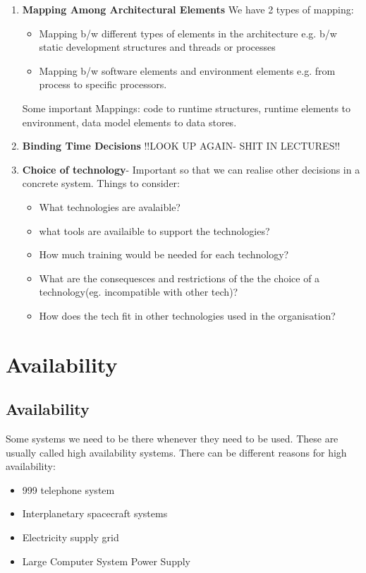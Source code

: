 \documentclass[a4paper]{report}
\begin{document}
\begin{enumerate}
\item \textbf{Mapping Among Architectural Elements}
We have 2 types of mapping:
\begin{itemize}
\item Mapping b/w different types of elements in the architecture e.g. b/w static development structures and threads or processes
\item Mapping b/w software elements and environment elements e.g. from process to specific processors.
\end{itemize}
Some important Mappings: code to runtime structures, runtime elements to environment, data model elements to data stores.

\item \textbf{Binding Time Decisions}
!!LOOK UP AGAIN- SHIT IN LECTURES!!

\item \textbf{Choice of technology}- Important so that we can realise other decisions in a concrete system. Things to consider:
\begin{itemize}
\item What technologies are avalaible?
\item what tools are availaible to support the technologies?
\item How much training would be needed for each technology?
\item What are the consequesces and restrictions of the the choice of a technology(eg. incompatible with other tech)?
\item How does the tech fit in other technologies used in the organisation?
\end{itemize}
\end{enumerate}
\chapter{Availability}
\section{Availability}

Some systems we need to	be there whenever they need to be used.	These are usually called high availability systems.	
There can be different reasons for high availability:	
\begin{itemize}
\item{999 telephone system}
\item{Interplanetary spacecraft systems}
\item{Electricity supply grid}
\item{Large Computer System Power Supply}
\end{itemize}
\end{document}

